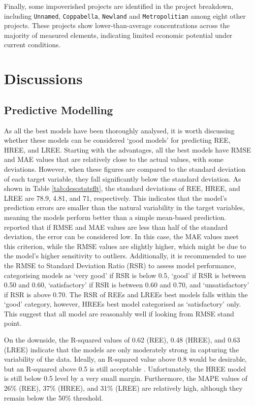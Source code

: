\documentclass[11pt,a4paper,]{article}
\begin{document}
Finally, some impoverished projects are identified in the project breakdown, including \texttt{Unnamed}, \texttt{Coppabella}, \texttt{Newland} and \texttt{Metropolitian} among eight other projects. These projects show lower-than-average concentrations across the majority of measured elements, indicating limited economic potential under current conditions.

\section{Discussions}\label{discussions}

\subsection{Predictive Modelling}\label{predictive-modelling-3}

As all the best models have been thoroughly analysed, it is worth discussing whether these models can be considered `good models' for predicting REE, HREE, and LREE. Starting with the advantages, all the best models have RMSE and MAE values that are relatively close to the actual values, with some deviations. However, when these figures are compared to the standard deviation of each target variable, they fall significantly below the standard deviation. As shown in Table \ref{tab:descstatsflt}, the standard deviations of REE, HREE, and LREE are 78.9, 4.81, and 71, respectively. This indicates that the model's prediction errors are smaller than the natural variability in the target variables, meaning the models perform better than a simple mean-based prediction. \textcite{Moriasi2007} reported that if RMSE and MAE values are less than half of the standard deviation, the error can be considered low. In this case, the MAE values meet this criterion, while the RMSE values are slightly higher, which might be due to the model's higher sensitivity to outliers. Additionally, it is recommended to use the RMSE to Standard Deviation Ratio (RSR) to assess model performance, categorising models as `very good' if RSR is below 0.5, `good' if RSR is between 0.50 and 0.60, `satisfactory' if RSR is between 0.60 and 0.70, and `unsatisfactory' if RSR is above 0.70. The RSR of REEs and LREEs best models falls within the `good' category, however, HREEs best model categorised as `satisfactory' only. This suggest that all model are reasonably well if looking from RMSE stand point.

On the downside, the R-squared values of 0.62 (REE), 0.48 (HREE), and 0.63 (LREE) indicate that the models are only moderately strong in capturing the variability of the data. Ideally, an R-squared value above 0.8 would be desirable, but an R-squared above 0.5 is still acceptable \autocite{Moriasi2007}. Unfortunately, the HREE model is still below 0.5 level by a very small margin. Furthermore, the MAPE values of 26\% (REE), 37\% (HREE), and 31\% (LREE) are relatively high, although they remain below the 50\% threshold.
\end{document}
